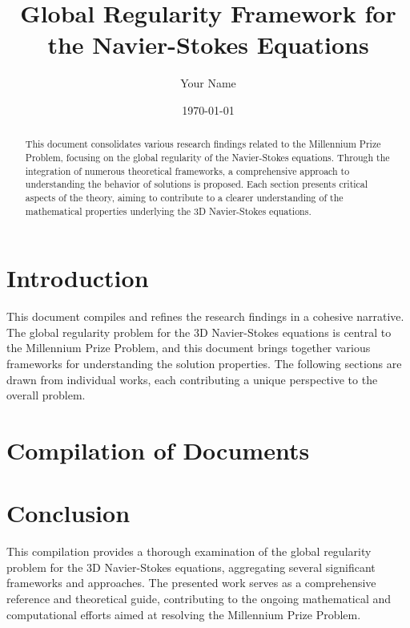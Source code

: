 \documentclass[12pt]{article}
\title{Global Regularity Framework for the Navier-Stokes Equations}
\author{Your Name}
\date{\today}
\begin{document}
\maketitle

\begin{abstract}
    This document consolidates various research findings related to the Millennium Prize Problem, focusing on the global regularity of the Navier-Stokes equations. Through the integration of numerous theoretical frameworks, a comprehensive approach to understanding the behavior of solutions is proposed. Each section presents critical aspects of the theory, aiming to contribute to a clearer understanding of the mathematical properties underlying the 3D Navier-Stokes equations.
\end{abstract}


\section{Introduction}
This document compiles and refines the research findings in a cohesive narrative. The global regularity problem for the 3D Navier-Stokes equations is central to the Millennium Prize Problem, and this document brings together various frameworks for understanding the solution properties. The following sections are drawn from individual works, each contributing a unique perspective to the overall problem.

\section{Compilation of Documents}


  

\section{Conclusion}
This compilation provides a thorough examination of the global regularity problem for the 3D Navier-Stokes equations, aggregating several significant frameworks and approaches. The presented work serves as a comprehensive reference and theoretical guide, contributing to the ongoing mathematical and computational efforts aimed at resolving the Millennium Prize Problem.

\end{document}
